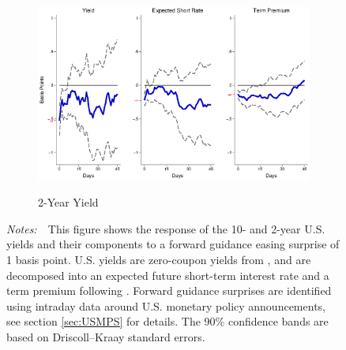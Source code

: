 \documentclass[a4paper, 12pt]{article}
\newcommand{\figtext}[1]{
	\vspace{-1ex}
	\captionsetup{justification=justified,font=footnotesize}
	\caption*{#1}
}
\newcommand{\fignotes}[1]{\figtext{\emph{Notes:~}~#1}}
\begin{document}
\begin{appendices}
\begin{landscape}
\begin{figure}[tbph]
\begin{center}
\begin{minipage}{\linewidth}
\begin{center}
						\begin{subfigure}[t]{\linewidth}
							\includegraphics[trim={0cm 0cm 0cm 0cm},clip,height=0.35\textheight,width=\linewidth]{../Figures/PathUSDnomyptp24mPre.eps} \\
							\vspace{-0.35cm}
							\caption{2-Year Yield} \label{subfig:LPUS2YpathPre}
						\end{subfigure}
						\vspace{-0.45cm}
					\end{center}
					\fignotes{This figure shows the response of the 10- and 2-year U.S. yields and their components to a forward guidance easing surprise of 1 basis point. U.S. yields are zero-coupon yields from \cite{GSW:2007}, and are decomposed into an expected future short-term interest rate and a term premium following \cite{KimWright:2005}. Forward guidance surprises are identified using intraday data around U.S. monetary policy announcements, see section \ref{sec:USMPS} for details. The 90\% confidence bands are based on Driscoll--Kraay standard errors.}
				\end{minipage}
			\end{center}
		\end{figure}
		
		\pagebreak[4]
		

\end{landscape}
\end{appendices}
\end{document}
